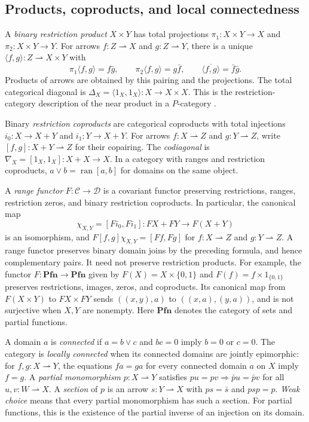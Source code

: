 \documentclass[11pt]{article}
\newcommand{\Pfn}{\mathbf{Pfn}}
\newcommand{\ran}{\operatorname{ran}}
\begin{document}
\subsection{Products, coproducts, and local connectedness}

A \emph{binary restriction product} $X\times Y$ has total
projections $\pi_1:X\times Y\to X$ and $\pi_2:X\times Y\to Y$.
For arrows $f:Z\rightharpoonup X$ and $g:Z\rightharpoonup Y$,
there is a unique $\langle f,g\rangle:Z\rightharpoonup X\times Y$
with
\[
 \pi_1\langle f,g\rangle=f\bar g,\qquad
 \pi_2\langle f,g\rangle=g\bar f,\qquad
 \overline{\langle f,g\rangle}=\bar f\bar g.
\]
Products of arrows are obtained by this pairing and the projections.
The total categorical diagonal is
$\Delta_X=\langle1_X,1_X\rangle:X\to X\times X$.
This is the restriction-category description of the near product
in a $P$-category \cite{Rosolini,CockettLack}.

Binary \emph{restriction coproducts} are categorical coproducts with
total injections $i_0:X\to X+Y$ and $i_1:Y\to X+Y$.
For arrows $f:X\rightharpoonup Z$ and $g:Y\rightharpoonup Z$,
write $[f,g]:X+Y\rightharpoonup Z$ for their copairing.
The \emph{codiagonal} is
$\nabla_X=[1_X,1_X]:X+X\to X$.
In a category with ranges and restriction coproducts,
$a\vee b=\ran[a,b]$ for domains on the same object.

A \emph{range functor} $F:\mathcal C\to\mathcal D$ is a covariant
functor preserving restrictions, ranges, restriction zeros, and binary
restriction coproducts. In particular, the canonical map
\[
 \chi_{X,Y}=[F i_0,F i_1]:FX+FY\longrightarrow F(X+Y)
\]
is an isomorphism, and
$F[f,g]\chi_{X,Y}=[Ff,Fg]$ for $f:X\rightharpoonup Z$ and
$g:Y\rightharpoonup Z$. A range functor preserves binary
domain joins by the preceding formula, and hence complementary pairs.
It need not preserve restriction products. For example, the functor
$F:\Pfn\to\Pfn$ given by $F(X)=X\times\{0,1\}$ and
$F(f)=f\times1_{\{0,1\}}$ preserves restrictions, images, zeros,
and coproducts. Its canonical map from $F(X\times Y)$ to
$FX\times FY$ sends $((x,y),a)$ to $((x,a),(y,a))$, and is
not surjective when $X,Y$ are nonempty. Here $\Pfn$ denotes the
category of sets and partial functions.

A domain $a$ is \emph{connected} if $a=b\vee c$ and $bc=0$
imply $b=0$ or $c=0$. The category is \emph{locally connected}
when its connected domains are jointly epimorphic: for
$f,g:X\rightharpoonup Y$, the equations $fa=ga$ for every connected
domain $a$ on $X$ imply $f=g$.
A \emph{partial monomorphism} $p:X\rightharpoonup Y$ satisfies
$pu=pv\Rightarrow\bar p u=\bar p v$ for all
$u,v:W\rightharpoonup X$.
A \emph{section} of $p$ is an arrow $s:Y\rightharpoonup X$
with $ps=\bar s$ and $psp=p$.
\emph{Weak choice} means that every partial monomorphism has such
a section. For partial functions, this is the existence of the
partial inverse of an injection on its domain.
\end{document}
